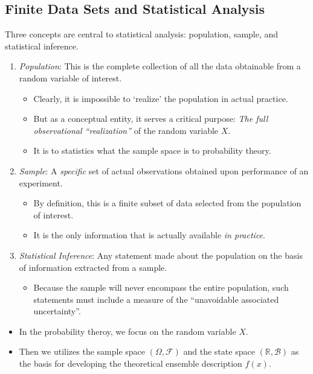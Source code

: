 \documentclass[twoside]{article}
\theoremstyle{definition}
\theoremstyle{remark}
\theoremstyle{remark}
\begin{document}
\subsection{Finite Data Sets and Statistical Analysis}
Three concepts are central to statistical analysis: population, sample, and
statistical inference.
\begin{enumerate}
  \item \textit{Population}: This is the complete collection of all the data
  obtainable from a random variable of interest.
  \begin{itemize}
    \item Clearly, it is impossible to `realize' the population in actual
    practice.
    \item But as a conceptual entity, it serves a critical purpose: \textit{The full
    observational ``realization''} of the random variable $X$.
    \item It is to statistics what the sample space is to probability theory.
  \end{itemize}
  \item \textit{Sample}: A \textit{specific} set of actual observations obtained
  upon performance of an experiment.
  \begin{itemize}
    \item By definition, this is a finite subset of data selected from the
    population of interest.
    \item It is the only information that is actually available
    \textit{in practice}.
  \end{itemize}
  \item \textit{Statistical Inference}: Any statement made about the population
  on the basis of information extracted from a sample.
  \begin{itemize}
    \item Because the sample will never encompass the entire population, such
    statements must include a measure of the ``unavoidable associated
    uncertainty''.
  \end{itemize}
\end{enumerate}


\begin{itemize}
  \item In the probability theroy, we focus on the random variable $X$.
  \item Then we utilizes the sample space $(\Omega, \mathcal{F})$ and the state
  space $(\mathbb{R}, \mathcal{B})$ as the basis for developing the theoretical ensemble description
  $f(x)$.
\end{itemize}
\end{document}

